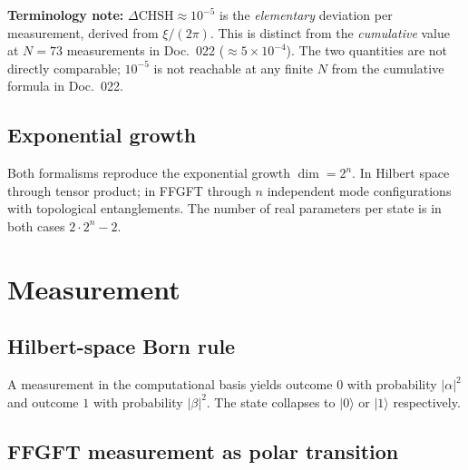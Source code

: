 \textbf{Terminology note:} $\Delta\text{CHSH} \approx 10^{-5}$ is the
\emph{elementary} deviation per measurement, derived from $\xi/(2\pi)$.
This is distinct from the \emph{cumulative} value at $N = 73$
measurements in Doc.~022 ($\approx 5 \times 10^{-4}$). The two
quantities are not directly comparable; $10^{-5}$ is not reachable
at any finite $N$ from the cumulative formula in Doc.~022.

\subsection{Exponential growth}

Both formalisms reproduce the exponential growth $\dim = 2^n$. In
Hilbert space through tensor product; in FFGFT through $n$
independent mode configurations with topological entanglements. The
number of real parameters per state is in both cases $2 \cdot 2^n - 2$.

\section{Measurement}

\subsection{Hilbert-space Born rule}

A measurement in the computational basis yields outcome $0$ with
probability $|\alpha|^2$ and outcome $1$ with probability $|\beta|^2$.
The state collapses to $|0\rangle$ or $|1\rangle$ respectively.

\subsection{FFGFT measurement as polar transition}

